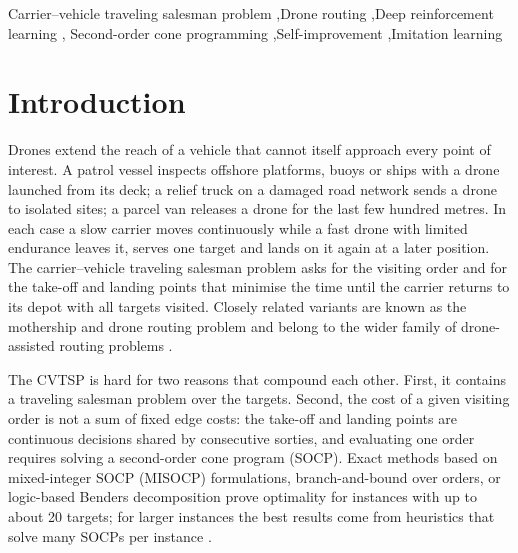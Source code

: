 \documentclass[preprint,review,12pt,authoryear]{elsarticle}
\begin{document}
\begin{frontmatter}
\begin{keyword}
Carrier--vehicle traveling salesman problem \sep Drone routing \sep Deep reinforcement learning \sep
Second-order cone programming \sep Self-improvement \sep Imitation learning
\end{keyword}

\end{frontmatter}

\section{Introduction}\label{sec:intro}

Drones extend the reach of a vehicle that cannot itself approach every point of interest. A patrol vessel
inspects offshore platforms, buoys or ships with a drone launched from its deck; a relief truck on a damaged
road network sends a drone to isolated sites; a parcel van releases a drone for the last few hundred metres.
In each case a slow carrier moves continuously while a fast drone with limited endurance leaves it, serves one
target and lands on it again at a later position. The carrier--vehicle traveling salesman problem
\citep[CVTSP;][]{garone2010cooperative,gambella2018exact} asks for the visiting order and for the take-off
and landing points that minimise the time until the carrier returns to its depot with all targets visited.
Closely related variants are known as the mothership and drone routing problem \citep{poikonen2020mothership}
and belong to the wider family of drone-assisted routing problems
\citep{murray2015flying,agatz2018optimization,otto2018optimization,macrina2020drone,chung2020optimization}.

The CVTSP is hard for two reasons that compound each other. First, it contains a traveling salesman problem
over the targets. Second, the cost of a given visiting order is not a sum of fixed edge costs: the
take-off and landing points are continuous decisions shared by consecutive sorties, and evaluating one order
requires solving a second-order cone program (SOCP). Exact methods based on mixed-integer SOCP (MISOCP)
formulations, branch-and-bound over orders, or logic-based Benders decomposition
\citep{gambella2018exact,erdogan2021exact,li2025exact} prove optimality for instances with up to about
20 targets; for larger instances the best results come from heuristics that solve many SOCPs per instance
\citep{poikonen2020mothership,li2025exact}.
\end{document}
